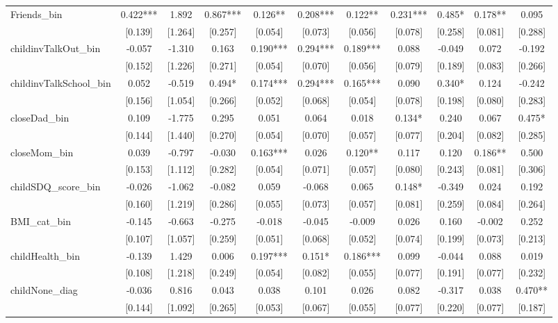 \documentclass[12pt]{article}
\begin{document}
\begin{table}[ht]
\begin{center}
\begin{adjustbox}{width=1.2\textwidth,center=\textwidth}
\begin{tabular}{l*{10}{c}}
Friends\_bin & 0.422*** & 1.892 & 0.867*** & 0.126** & 0.208*** & 0.122** & 0.231*** & 0.485* & 0.178** & 0.095 \\
 & [0.139] & [1.264] & [0.257] & [0.054] & [0.073] & [0.056] & [0.078] & [0.258] & [0.081] & [0.288] \\
childinvTalkOut\_bin & -0.057 & -1.310 & 0.163 & 0.190*** & 0.294*** & 0.189*** & 0.088 & -0.049 & 0.072 & -0.192 \\
 & [0.152] & [1.226] & [0.271] & [0.054] & [0.070] & [0.056] & [0.079] & [0.189] & [0.083] & [0.266] \\
childinvTalkSchool\_bin & 0.052 & -0.519 & 0.494* & 0.174*** & 0.294*** & 0.165*** & 0.090 & 0.340* & 0.124 & -0.242 \\
 & [0.156] & [1.054] & [0.266] & [0.052] & [0.068] & [0.054] & [0.078] & [0.198] & [0.080] & [0.283] \\
closeDad\_bin & 0.109 & -1.775 & 0.295 & 0.051 & 0.064 & 0.018 & 0.134* & 0.240 & 0.067 & 0.475* \\
 & [0.144] & [1.440] & [0.270] & [0.054] & [0.070] & [0.057] & [0.077] & [0.204] & [0.082] & [0.285] \\
closeMom\_bin & 0.039 & -0.797 & -0.030 & 0.163*** & 0.026 & 0.120** & 0.117 & 0.120 & 0.186** & 0.500 \\
 & [0.153] & [1.112] & [0.282] & [0.054] & [0.071] & [0.057] & [0.080] & [0.243] & [0.081] & [0.306] \\
childSDQ\_score\_bin & -0.026 & -1.062 & -0.082 & 0.059 & -0.068 & 0.065 & 0.148* & -0.349 & 0.024 & 0.192 \\
 & [0.160] & [1.219] & [0.286] & [0.055] & [0.073] & [0.057] & [0.081] & [0.259] & [0.084] & [0.264] \\
BMI\_cat\_bin & -0.145 & -0.663 & -0.275 & -0.018 & -0.045 & -0.009 & 0.026 & 0.160 & -0.002 & 0.252 \\
 & [0.107] & [1.057] & [0.259] & [0.051] & [0.068] & [0.052] & [0.074] & [0.199] & [0.073] & [0.213] \\
childHealth\_bin & -0.139 & 1.429 & 0.006 & 0.197*** & 0.151* & 0.186*** & 0.099 & -0.044 & 0.088 & 0.019 \\
 & [0.108] & [1.218] & [0.249] & [0.054] & [0.082] & [0.055] & [0.077] & [0.191] & [0.077] & [0.232] \\
childNone\_diag & -0.036 & 0.816 & 0.043 & 0.038 & 0.101 & 0.026 & 0.082 & -0.317 & 0.038 & 0.470** \\
 & [0.144] & [1.092] & [0.265] & [0.053] & [0.067] & [0.055] & [0.077] & [0.220] & [0.077] & [0.187] \\

\end{tabular}
\end{adjustbox}
\end{center}
\end{table}
\end{document}
